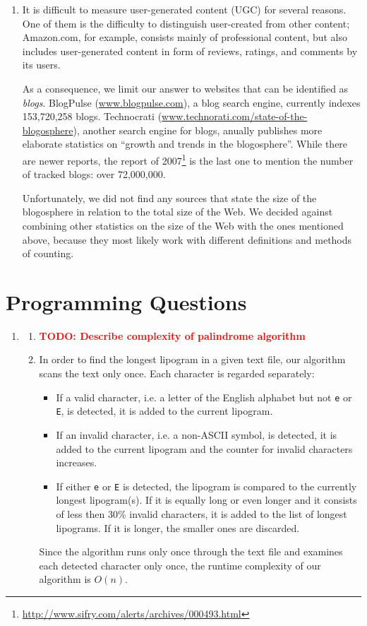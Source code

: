 \documentclass[a4paper,11pt,oneside]{book}
\newcommand{\todo}[1]{\textcolor{red}{\textbf{TODO: #1}}}
\begin{document}
\begin{enumerate}
	\item It is difficult to measure user-generated content (UGC) for several reasons. One of them is the difficulty to distinguish user-created from other content; Amazon.com, for example, consists mainly of professional content, but also includes user-generated content in form of reviews, ratings, and comments by its users.
	
	As a consequence, we limit our answer to websites that can be identified as \emph{blogs}. BlogPulse (\url{www.blogpulse.com}), a blog search engine, currently indexes 153,720,258 blogs. Technocrati (\url{www.technorati.com/state-of-the-blogosphere}), another search engine for blogs, anually publishes more elaborate statistics on ``growth and trends in the blogo\-sphere''. While there are newer reports, the report of 2007\footnote{\url{http://www.sifry.com/alerts/archives/000493.html}} is the last one to mention the number of tracked blogs: over 72,000,000. 
	
	Unfortunately, we did not find any sources that state the size of the blogo\-sphere in relation to the total size of the Web. We decided against combining other statistics on the size of the Web with the ones mentioned above, because they most likely work with different definitions and methods of counting.
\end{enumerate}



\chapter{Programming Questions}

\begin{enumerate}
	\item	\begin{enumerate}
					\item \todo{Describe complexity of palindrome algorithm}
					\item In order to find the longest lipogram in a given text file, our algorithm scans the text only once. Each character is regarded separately: \begin{itemize}
							\item If a valid character, i.e. a letter of the English alphabet but not \texttt{e} or \texttt{E}, is detected, it is added to the current lipogram.
							\item If an invalid character, i.e. a non-ASCII symbol, is detected, it is added to the current lipogram and the counter for invalid characters increases.
							\item If either \texttt{e} or \texttt{E} is detected, the lipogram is compared to the currently longest lipogram(s). If it is equally long or even longer and it consists of less then 30\% invalid characters, it is added to the list of longest lipograms. If it is longer, the smaller ones are discarded.
						\end{itemize}
						Since the algorithm runs only once through the text file and examines each detected character only once, the runtime complexity of our algorithm is $O(n)$.
				\end{enumerate}
\end{enumerate}


\end{document}
